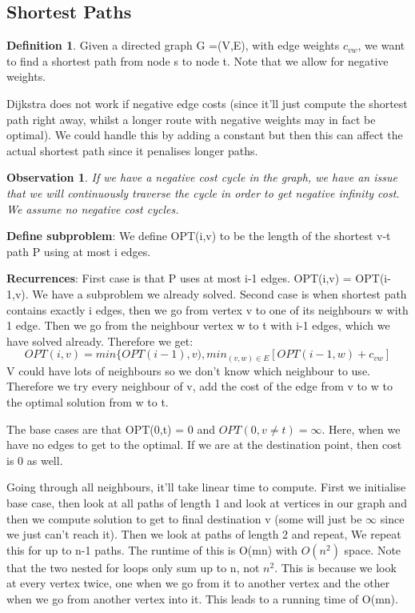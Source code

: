 \documentclass[11pt, oneside]{article}
\newtheorem{observation}[theorem]{\textbf{Observation}}
\theoremstyle{definition}
\newtheorem{definition}{Definition}[section]
\begin{document}
\subsection{Shortest Paths}
\begin{definition}
  Given a directed graph G =(V,E), with edge weights $c_{vw}$, we want to find a shortest path from node s to node t. Note that we allow for negative weights.
\end{definition}

Dijkstra does not work if negative edge costs (since it'll just compute the shortest path right away, whilst a longer route with negative weights may in fact be optimal). We could handle this by adding a constant but then this can affect the actual shortest path since it penalises longer paths.

\begin{observation}
  If we have a negative cost cycle in the graph, we have an issue that we will continuously traverse the cycle in order to get negative infinity cost. We assume no negative cost cycles.
\end{observation}

\textbf{Define subproblem}: We define OPT(i,v) to be the length of the shortest v-t path P using at most i edges.

\textbf{Recurrences}: First case is that P uses at most i-1 edges. OPT(i,v) = OPT(i-1,v). We have a subproblem we already solved. Second case is when shortest path contains exactly i edges, then we go from vertex v to one of its neighbours w with 1 edge. Then we go from the neighbour vertex w to t with i-1 edges, which we have solved already. Therefore we get:
$$
OPT(i,v) = min\{OPT(i-1),v), min_{(v,w) \in E}[OPT(i-1,w) + c_{vw}]
$$
V could have lots of neighbours so we don't know which neighbour to use. Therefore we try every neighbour of v, add the cost of the edge from v to w to the optimal solution from w to t.

The base cases are that OPT(0,t) = 0 and $OPT(0,v \neq t) = \infty$. Here, when we have no edges to get to the optimal. If we are at the destination point, then cost is 0 as well.

Going through all neighbours, it'll take linear time to compute. First we initialise base case, then look at all paths of length 1 and look at vertices in our graph and then we compute solution to get to final destination v (some will just be $\infty$ since we just can't reach it). Then we look at paths of length 2 and repeat, We repeat this for up to n-1 paths. The runtime of this is O(mn) with $O(n^2)$ space. Note that the two nested for loops only sum up to n, not $n^2$. This is because we look at every vertex twice, one when we go from it to another vertex and the other when we go from another vertex into it. This leads to a running time of O(mn).
\end{document}
